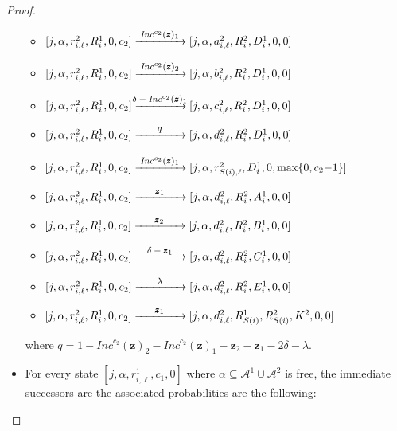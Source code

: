 \documentclass[a4paper,UKenglish,cleveref, autoref, thm-restate]{lipics-v2021}
\newcommand{\A}{\mathcal{A}}
\newcommand{\tran}[1]{\xrightarrow{\makebox[4em]{\footnotesize$#1$}}}
\newcommand{\INC}{\mathit{Inc}}
\renewcommand{\vec}[1]{\pmb{#1}}
\newcommand{\vv}[1]{\INC^{#1}(\vec{z})}
\begin{document}
\begin{proof}
\begin{itemize}
  \begin{itemize}
      \item $[j,\alpha,r_{i,\ell}^2,R_i^1,0,c_2] \tran{\vv{c_2}_1}
             [j,\alpha,a_{i,\ell}^2,R_i^2,D_i^1,0,0]$ 
      \item $[j,\alpha,r_{i,\ell}^2,R_i^1,0,c_2] \tran{\vv{c_2}_2}
             [j,\alpha,b_{i,\ell}^2,R_i^2,D_i^1,0,0]$ 
      \item $[j,\alpha,r_{i,\ell}^2,R_i^1,0,c_2] \tran{\delta - \vv{c_2}_1}
             [j,\alpha,c_{i,\ell}^2,R_i^2,D_i^1,0,0]$        
      \item $[j,\alpha,r_{i,\ell}^2,R_i^1,0,c_2] \tran{q}
             [j,\alpha,d_{i,\ell}^2,R_i^2,D_i^1,0,0]$ 
      \item $[j,\alpha,r_{i,\ell}^2,R_i^1,0,c_2] \tran{\vv{c_2}_1}
             [j,\alpha,r_{S(i),\ell}^2,D_i^1,0,\max\{0,c_2{-}1\}]$ 
      \item $[j,\alpha,r_{i,\ell}^2,R_i^1,0,c_2] \tran{\vec{z}_1}
             [j,\alpha,d_{i,\ell}^2,R_i^2,A_i^1,0,0]$ 
      \item $[j,\alpha,r_{i,\ell}^2,R_i^1,0,c_2] \tran{\vec{z}_2}
             [j,\alpha,d_{i,\ell}^2,R_i^2,B_i^1,0,0]$ 
      \item $[j,\alpha,r_{i,\ell}^2,R_i^1,0,c_2] \tran{\delta - \vec{z}_1}
             [j,\alpha,d_{i,\ell}^2,R_i^2,C_i^1,0,0]$ 
      \item $[j,\alpha,r_{i,\ell}^2,R_i^1,0,c_2] \tran{\lambda}
             [j,\alpha,d_{i,\ell}^2,R_i^2,E_i^1,0,0]$ 
      \item $[j,\alpha,r_{i,\ell}^2,R_i^1,0,c_2] \tran{\vec{z}_1}
             [j,\alpha,d_{i,\ell}^2,R_{S(i)}^1,R_{S(i)}^2,K^2,0,0]$ 
  \end{itemize}
     where $q = 1 - \vv{c_2}_2 - \vv{c_2}_1 -\vec{z}_2 - \vec{z}_1  - 2\delta -\lambda$.
  \item  For every state  $[j,\alpha,r^1_{i,\ell},c_1,0]$ where $\alpha \subseteq \A^1 \cup \A^2$ is free, the immediate successors are the associated probabilities are the following:
\end{itemize}
\end{proof}
\end{document}
